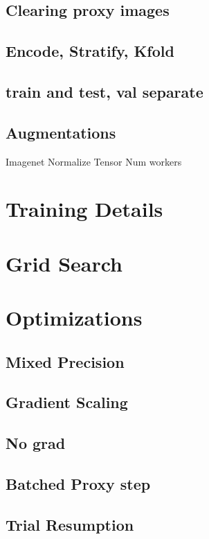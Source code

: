 \subsection{Clearing proxy images}

\subsection{Encode, Stratify, Kfold}

\subsection{train and test, val separate}

\subsection{Augmentations}
    Imagenet Normalize
    Tensor
    Num workers

\section{Training Details}

\section{Grid Search}

\section{Optimizations}
\subsection{Mixed Precision}
\subsection{Gradient Scaling}
\subsection{No grad}
\subsection{Batched Proxy step}
\subsection{Trial Resumption}



